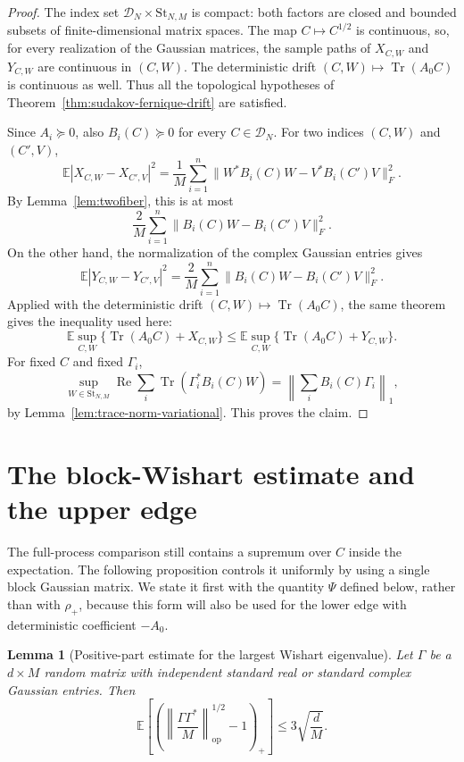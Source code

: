 \documentclass{article}
\newtheorem{lemma}[theorem]{Lemma}
\newcommand{\E}{\mathbb E}
\newcommand{\DN}{\mathcal D_N}
\newcommand{\St}{\mathrm{St}}
\newcommand{\op}{\mathrm{op}}
\DeclareMathOperator{\Tr}{Tr}
\DeclareMathOperator{\Rea}{Re}
\begin{document}
\begin{proof}
	The index set \(\DN\times\St_{N,M}\) is compact: both factors are closed
	and bounded subsets of finite-dimensional matrix spaces.  The map
	\(C\mapsto C^{1/2}\) is continuous, so, for every realization of the
	Gaussian matrices, the sample paths of \(X_{C,W}\) and \(Y_{C,W}\) are
	continuous in \((C,W)\).  The deterministic drift
	\((C,W)\mapsto\Tr(A_0C)\) is continuous as well.  Thus all the topological
	hypotheses of Theorem~\ref{thm:sudakov-fernique-drift} are satisfied.

	Since $A_i\succeq0$, also $B_i(C)\succeq0$ for every $C\in\DN$.
	For two indices $(C,W)$ and $(C',V)$,
	\[
		\E|X_{C,W}-X_{C',V}|^2
		=\frac1M\sum_{i=1}^n
		\|W^*B_i(C)W-V^*B_i(C')V\|_F^2.
	\]
	By Lemma~\ref{lem:twofiber}, this is at most
	\[
		\frac2M\sum_{i=1}^n\|B_i(C)W-B_i(C')V\|_F^2.
	\]
	On the other hand, the normalization of the complex Gaussian entries gives
	\[
		\E|Y_{C,W}-Y_{C',V}|^2
		=\frac2M\sum_{i=1}^n\|B_i(C)W-B_i(C')V\|_F^2.
	\]
	Applied with the deterministic drift $(C,W)\mapsto\Tr(A_0C)$, the same theorem
	gives the inequality used here:
	\[
		\E\sup_{C,W}\{\Tr(A_0C)+X_{C,W}\}
		\le
		\E\sup_{C,W}\{\Tr(A_0C)+Y_{C,W}\}.
	\]
	For fixed $C$ and fixed $\Gamma_i$,
	\[
		\sup_{W\in\St_{N,M}}\Rea\sum_i\Tr(\Gamma_i^*B_i(C)W)
		=\left\|\sum_iB_i(C)\Gamma_i\right\|_1,
	\]
	by Lemma~\ref{lem:trace-norm-variational}.  This proves the claim.
\end{proof}

\section{The block-Wishart estimate and the upper edge}
\label{sec:block-wishart}

The full-process comparison still contains a supremum over $C$ inside the
expectation.  The following proposition controls it uniformly by using a single
block Gaussian matrix.  We state it first with the quantity $\Psi$ defined below, rather than
with $\rho_+$, because this form will also be used for the lower edge with
deterministic coefficient $-A_0$.

\begin{lemma}[Positive-part estimate for the largest Wishart eigenvalue]
	\label{lem:wishart-estimate}
	Let $\Gamma$ be a $d\times M$ random matrix with independent standard real or
	standard complex Gaussian entries.  Then
	\[
		\E\left[
			\left(
			\left\|\frac{\Gamma\Gamma^*}{M}\right\|_{\op}^{1/2}
			-1
			\right)_+
			\right]
		\le
		3\sqrt{\frac{d}{M}} .
	\]
\end{lemma}
\end{document}
